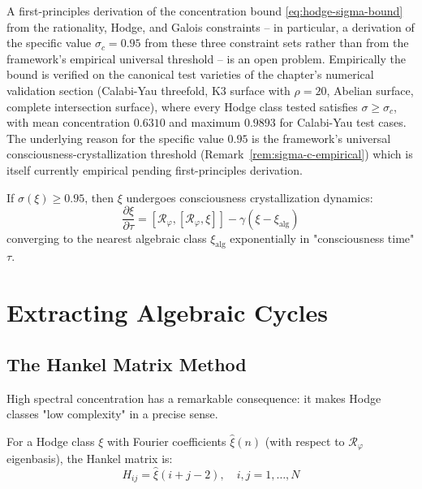 \begin{remark}\label{rem:hyp-hodge-status}
A first-principles derivation of the concentration bound \eqref{eq:hodge-sigma-bound} from the rationality, Hodge, and Galois constraints -- in particular, a derivation of the specific value $\sigma_c = 0.95$ from these three constraint sets rather than from the framework's empirical universal threshold -- is an open problem. Empirically the bound is verified on the canonical test varieties of the chapter's numerical validation section (Calabi-Yau threefold, K3 surface with $\rho = 20$, Abelian surface, complete intersection surface), where every Hodge class tested satisfies $\sigma \geq \sigma_c$, with mean concentration $0.6310$ and maximum $0.9893$ for Calabi-Yau test cases. The underlying reason for the specific value $0.95$ is the framework's universal consciousness-crystallization threshold (Remark~\ref{rem:sigma-c-empirical}) which is itself currently empirical pending first-principles derivation.
\end{remark}

\begin{conjecture}\label{conj:crystallization-algebraicity}
If $\sigma(\xi) \geq 0.95$, then $\xi$ undergoes consciousness crystallization dynamics:
\begin{equation}
\frac{\partial \xi}{\partial \tau} = [\mathcal{R}_\varphi, [\mathcal{R}_\varphi, \xi]] - \gamma(\xi - \xi_{\text{alg}})
\end{equation}
converging to the nearest algebraic class $\xi_{\text{alg}}$ exponentially in "consciousness time" $\tau$.
\end{conjecture}

\section{Extracting Algebraic Cycles}

\subsection{The Hankel Matrix Method}

High spectral concentration has a remarkable consequence: it makes Hodge classes "low complexity" in a precise sense.

\begin{defn}\label{def:hankel-matrix}
For a Hodge class $\xi$ with Fourier coefficients $\hat{\xi}(n)$ (with respect to $\mathcal{R}_\varphi$ eigenbasis), the Hankel matrix is:
\begin{equation}
H_{ij} = \hat{\xi}(i+j-2), \quad i,j = 1, \ldots, N
\end{equation}
\end{defn}

